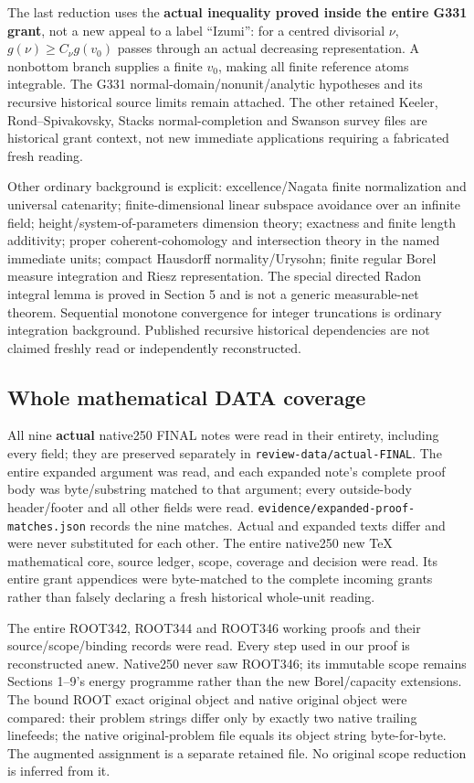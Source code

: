 \documentclass[
]{article}
\begin{document}
The last reduction uses the \textbf{actual inequality proved inside the
entire G331 grant}, not a new appeal to a label ``Izumi'': for a centred
divisorial \(\nu\), \(g(\nu)\ge C_\nu g(v_0)\) passes through an actual
decreasing representation. A nonbottom branch supplies a finite \(v_0\),
making all finite reference atoms integrable. The G331
normal-domain/nonunit/analytic hypotheses and its recursive historical
source limits remain attached. The other retained Keeler,
Rond--Spivakovsky, Stacks normal-completion and Swanson survey files are
historical grant context, not new immediate applications requiring a
fabricated fresh reading.

Other ordinary background is explicit: excellence/Nagata finite
normalization and universal catenarity; finite-dimensional linear
subspace avoidance over an infinite field; height/system-of-parameters
dimension theory; exactness and finite length additivity; proper
coherent-cohomology and intersection theory in the named immediate
units; compact Hausdorff normality/Urysohn; finite regular Borel measure
integration and Riesz representation. The special directed Radon
integral lemma is proved in Section 5 and is not a generic
measurable-net theorem. Sequential monotone convergence for integer
truncations is ordinary integration background. Published recursive
historical dependencies are not claimed freshly read or independently
reconstructed.

\subsection{Whole mathematical DATA
coverage}\label{whole-mathematical-data-coverage}

All nine \textbf{actual} native250 FINAL notes were read in their
entirety, including every field; they are preserved separately in
\texttt{review-data/actual-FINAL}. The entire expanded argument was
read, and each expanded note's complete proof body was byte/substring
matched to that argument; every outside-body header/footer and all other
fields were read. \texttt{evidence/expanded-proof-matches.json} records
the nine matches. Actual and expanded texts differ and were never
substituted for each other. The entire native250 new TeX mathematical
core, source ledger, scope, coverage and decision were read. Its entire
grant appendices were byte-matched to the complete incoming grants
rather than falsely declaring a fresh historical whole-unit reading.

The entire ROOT342, ROOT344 and ROOT346 working proofs and their
source/scope/binding records were read. Every step used in our proof is
reconstructed anew. Native250 never saw ROOT346; its immutable scope
remains Sections 1--9's energy programme rather than the new
Borel/capacity extensions. The bound ROOT exact original object and
native original object were compared: their problem strings differ only
by exactly two native trailing linefeeds; the native original-problem
file equals its object string byte-for-byte. The augmented assignment is
a separate retained file. No original scope reduction is inferred from
it.
\end{document}
